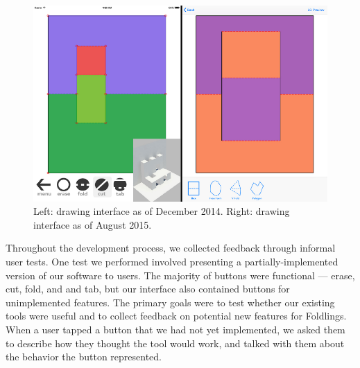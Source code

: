 \begin{figure}[htbp]
\centering
\includegraphics{figures/31_UI_Interface_Iteration/beforeafterinface.pdf}
\caption{Left: drawing interface as of December 2014. Right: drawing
interface as of August 2015.}
\end{figure}

Throughout the development process, we collected feedback through
informal user tests. One test we performed involved presenting a
partially-implemented version of our software to users. The majority of
buttons were functional --- erase, cut, fold, and and tab, but our
interface also contained buttons for unimplemented features. The primary
goals were to test whether our existing tools were useful and to collect
feedback on potential new features for Foldlings. When a user tapped a
button that we had not yet implemented, we asked them to describe how
they thought the tool would work, and talked with them about the
behavior the button represented.


